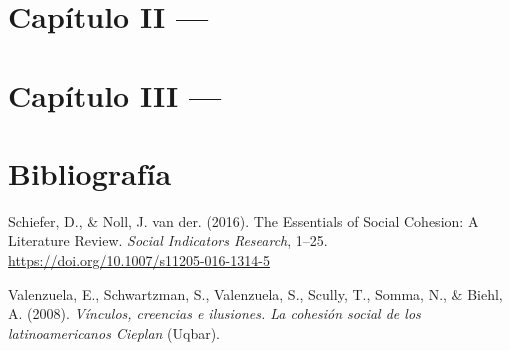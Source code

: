 \documentclass[
  12pt,
]{book}
\newlength{\cslhangindent}
\newlength{\cslentryspacingunit} %
\newenvironment{CSLReferences}[2] %
 {%
  \setlength{\parindent}{0pt}
  \ifodd #1
  \let\oldpar\par
  \def\par{\hangindent=\cslhangindent\oldpar}
  \fi
  \setlength{\parskip}{#2\cslentryspacingunit}
 }%
 {}
\begin{document}
\hypertarget{capuxedtulo-ii}{%
\chapter{Capítulo II ---}\label{capuxedtulo-ii}}

\hypertarget{capuxedtulo-iii}{%
\chapter{Capítulo III ---}\label{capuxedtulo-iii}}

\hypertarget{bibliografuxeda}{%
\chapter*{Bibliografía}\label{bibliografuxeda}}

\hypertarget{refs}{}
\begin{CSLReferences}{1}{0}
\leavevmode{}%
Schiefer, D., \& Noll, J. van der. (2016). The {Essentials} of {Social Cohesion}: {A Literature Review}. \emph{Social Indicators Research}, 1--25. \url{https://doi.org/10.1007/s11205-016-1314-5}

\leavevmode{}%
Valenzuela, E., Schwartzman, S., Valenzuela, S., Scully, T., Somma, N., \& Biehl, A. (2008). \emph{{Vínculos, creencias e ilusiones. La cohesión social de los latinoamericanos \textendash{} Cieplan}} (Uqbar).

\end{CSLReferences}
\end{document}
